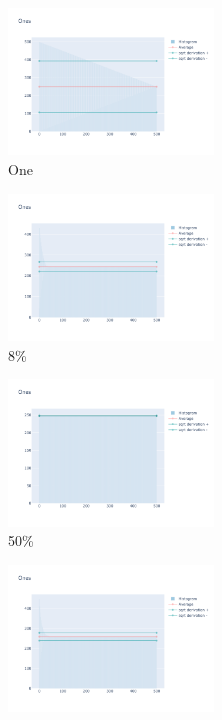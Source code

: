\documentclass[12pt, fleqn]{report}                             %
\theoremstyle{break}                                            %
\begin{document}
      \begin{figure}[ht!]
        \centering
        \begin{subfigure}[b]{0.4\linewidth}
          \includegraphics[width=0.6\textwidth]{Images/57/dia-a.png}
          \caption{One}
        \end{subfigure}
        \begin{subfigure}[b]{0.4\linewidth}
          \includegraphics[width=0.6\textwidth]{Images/57/dia-b.png}
          \caption{8\%}
        \end{subfigure}
        \begin{subfigure}[b]{0.4\linewidth}
          \includegraphics[width=0.6\textwidth]{Images/57/dia-c.png}
          \caption{50\%}
        \end{subfigure}
        \begin{subfigure}[b]{0.4\linewidth}
          \includegraphics[width=0.6\textwidth]{Images/57/dia-d.png}

\end{subfigure}
\end{figure}
\end{document}
